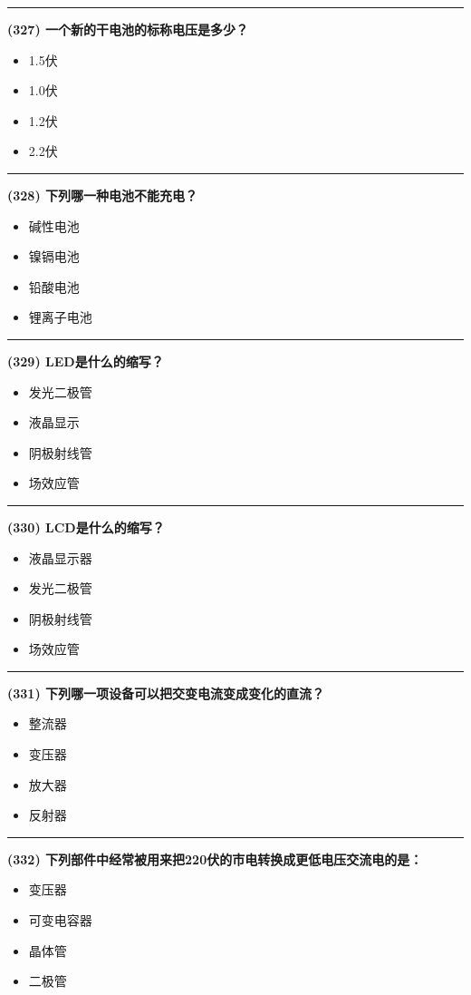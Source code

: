 \documentclass[twocolumn]{ctexart}  %
\begin{document}
\noindent\rule{0.5\textwidth}{1pt}
\heiti \textbf{(327) 一个新的干电池的标称电压是多少？} \songti {\color{gray} [LK1153] }
\begin{itemize}
	\item  1.5伏
	\item  1.0伏
	\item  1.2伏
	\item  2.2伏
\end{itemize}


\noindent\rule{0.5\textwidth}{1pt}
\heiti \textbf{(328) 下列哪一种电池不能充电？} \songti {\color{gray} [LK1154] }
\begin{itemize}
	\item  碱性电池
	\item  镍镉电池
	\item  铅酸电池
	\item  锂离子电池
\end{itemize}


\noindent\rule{0.5\textwidth}{1pt}
\heiti \textbf{(329) LED是什么的缩写？} \songti {\color{gray} [LK1162] }
\begin{itemize}
	\item  发光二极管
	\item  液晶显示
	\item  阴极射线管
	\item  场效应管
\end{itemize}


\noindent\rule{0.5\textwidth}{1pt}
\heiti \textbf{(330) LCD是什么的缩写？} \songti {\color{gray} [LK1163] }
\begin{itemize}
	\item  液晶显示器
	\item  发光二极管
	\item  阴极射线管
	\item  场效应管
\end{itemize}


\noindent\rule{0.5\textwidth}{1pt}
\heiti \textbf{(331) 下列哪一项设备可以把交变电流变成变化的直流？} \songti {\color{gray} [LK1167] }
\begin{itemize}
	\item  整流器
	\item  变压器
	\item  放大器
	\item  反射器
\end{itemize}


\noindent\rule{0.5\textwidth}{1pt}
\heiti \textbf{(332) 下列部件中经常被用来把220伏的市电转换成更低电压交流电的是：} \songti {\color{gray} [LK1169] }
\begin{itemize}
	\item  变压器
	\item  可变电容器
	\item  晶体管
	\item  二极管
\end{itemize}
\end{document}
